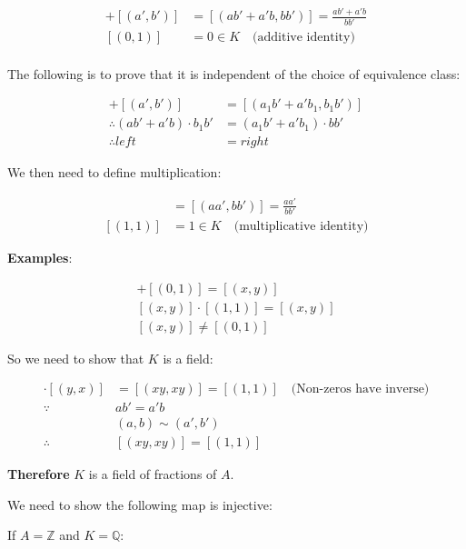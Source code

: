 \documentclass{article}
\begin{document}
    \begin{align*}
        [(a, b)] + [(a', b')] &= [(ab' + a'b, bb')] = \frac{ab' + a'b}{bb'} \\
        [(0, 1)] &= 0 \in K \quad \text{(additive identity)} \\
    \end{align*}
    
    The following is to prove that it is independent of the choice of equivalence class:
    
    \begin{align*}
        [(a_{1}, b_{1})] + [(a', b')] &= [(a_{1}b' + a'b_{1}, b_{1}b')] \\
        \therefore (ab' + a'b) \cdot b_{1}b' &= (a_{1}b' + a'b_{1}) \cdot bb' \\
        \therefore left &= right
    \end{align*}
    
    We then need to define multiplication:
    
    \begin{align*}
        [(a, b)] [(a', b')] &= [(aa', bb')] = \frac{aa'}{bb'} \\
        [(1, 1)] &= 1 \in K \quad \text{(multiplicative identity)}
    \end{align*}
    
    \textbf{Examples}:
    
    \begin{align*}
        [(x, y)] + [(0, 1)] = [(x, y)] \\
        [(x, y)] \cdot [(1, 1)] = [(x, y)] \\
        [(x, y)] \neq [(0, 1)]
    \end{align*}
    
    So we need to show that $K$ is a field:
    
    \begin{align*}
        [(x, y)] \cdot [(y, x)] &= [(xy, xy)] = [(1, 1)] \quad \text{(Non-zeros have inverse)} \\
        \because &ab' = a'b \\
                       &(a, b) \sim (a', b') \\
        \therefore &[(xy, xy)] = [(1, 1)]
    \end{align*}
    
    \textbf{Therefore} $K$ is a field of fractions of $A$.
    
    We need to show the following map is injective:
    
    If $A = \mathbb{Z}$ and $K = \mathbb{Q}$:
    
\end{document}
